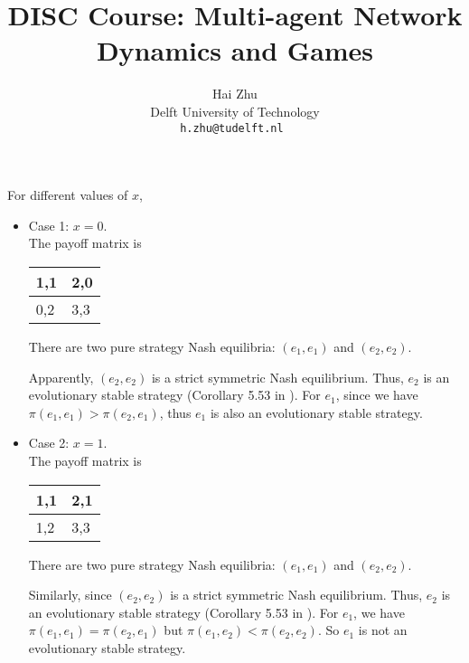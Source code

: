 \documentclass[a4 paper, 12pt]{article}
\title{
        \Large{DISC Course: Multi-agent Network Dynamics and Games}\\
        \vspace{1em}
        \large\tb{Homework 3}
}
\author{
        \small Hai Zhu                          \\
        \small Delft University of Technology   \\
        \tt\small h.zhu@tudelft.nl
 }
\date{\small\ti{\today}}
\begin{document}
\maketitle


 For different values of $x$,
\begin{itemize}
        \item Case 1: $x=0$. \\
        The payoff matrix is 
        \begin{center}
                \begin{tabular}{ | m{1em} | m{1em}| } 
                \hline
                1,1& 2,0 \\ 
                \hline
                0,2 & 3,3 \\ 
                \hline
                \end{tabular}
        \end{center}
        There are two pure strategy Nash equilibria: $(e_1,e_1)$ and $(e_2,e_2)$.

        Apparently, $(e_2,e_2)$ is a strict symmetric Nash equilibrium. Thus, $e_2$ is an evolutionary stable strategy (Corollary 5.53 in \cite{b1}). For $e_1$, since we have $\pi(e_1,e_1)>\pi(e_2,e_1)$, thus $e_1$ is also an evolutionary stable strategy.

        \item Case 2: $x=1$. \\
        The payoff matrix is 
        \begin{center}
                \begin{tabular}{ | m{1em} | m{1em}| } 
                \hline
                1,1& 2,1 \\ 
                \hline
                1,2 & 3,3 \\ 
                \hline
                \end{tabular}
        \end{center}
        There are two pure strategy Nash equilibria: $(e_1,e_1)$ and $(e_2,e_2)$.

        Similarly, since $(e_2,e_2)$ is a strict symmetric Nash equilibrium. Thus, $e_2$ is an evolutionary stable strategy (Corollary 5.53 in \cite{b1}). For $e_1$, we have $\pi(e_1,e_1)=\pi(e_2,e_1)$ but $\pi(e_1,e_2)<\pi(e_2,e_2)$. So $e_1$ is not an evolutionary stable strategy.


\end{itemize}
\end{document}
